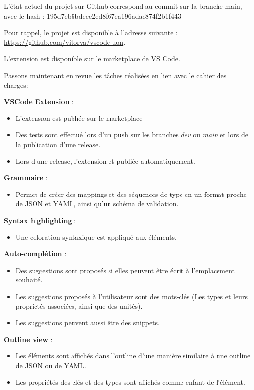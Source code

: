 \documentclass[
    iict, %
    il, %
]{heig-tb}
\begin{document}
L'état actuel du projet sur Github correspond au commit sur la branche main, avec le hash :
195d7eb6bdeee2ed8f67ea196adae874f2b1f443

Pour rappel, le projet est disponible à l'adresse suivante : \url{https://github.com/vitorva/vscode-uon}.

L'extension est \href{https://marketplace.visualstudio.com/items?itemName=vitorva.vscode-uon}{disponible} sur le marketplace de VS Code.

Passons maintenant en revue les tâches réalisées en lien avec le cahier des charges:

\textbf{VSCode Extension} :
\begin{itemize}
    \item L'extension est publiée sur le marketplace
    \item Des tests sont effectué lors d'un push sur les branches \emph{dev} ou \emph{main} et lors de la publication d'une release.
    \item Lors d'une release, l'extension et publiée automatiquement.
\end{itemize}

\textbf{Grammaire} :
\begin{itemize}
    \item Permet de créer des mappings et des séquences de type en un format proche de JSON et YAML, ainsi qu'un schéma de validation.
\end{itemize}

\textbf{Syntax highlighting} :
\begin{itemize}
    \item Une coloration syntaxique est appliqué aux éléments.
\end{itemize}

\textbf{Auto-complétion} :
\begin{itemize}
    \item Des suggestions sont proposés si elles peuvent être écrit à l'emplacement souhaité.
    \item Les suggestions proposés à l'utilisateur sont des mots-clés (Les types et leurs propriétés associées, ainsi que des unités).
    \item Les suggestions peuvent aussi être des snippets.
\end{itemize}

\textbf{Outline view} :
\begin{itemize}
    \item Les éléments sont affichés dans l'outline d'une manière similaire à une outline de JSON ou de YAML.
    \item Les propriétés des clés et des types sont affichés comme enfant de l'élément.
\end{itemize}
\end{document}
